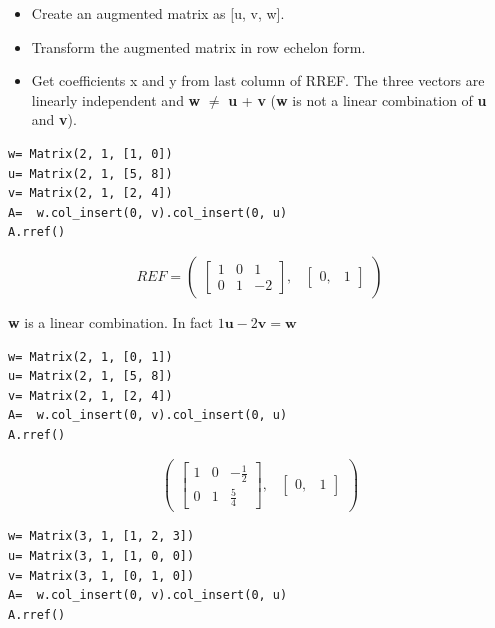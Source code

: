 \begin{itemize}
\item Create an augmented matrix as [u, v, w].
\item Transform the augmented matrix in row echelon form.
\item Get coefficients x and y from last column of RREF. The three vectors are linearly
independent and \textbf{w} $\neq$ \textbf{u} + \textbf{v} (\textbf{w} is not a linear
combination of \textbf{u} and \textbf{v}).

\end{itemize}

\begin{verbatim}
w= Matrix(2, 1, [1, 0])
u= Matrix(2, 1, [5, 8])
v= Matrix(2, 1, [2, 4])
A=  w.col_insert(0, v).col_insert(0, u)
A.rref()
\end{verbatim}

\begin{equation}
REF= \begin{pmatrix}\left[\begin{matrix}1 & 0 & 1\\0 & 1 & -2\end{matrix}\right], & \begin{bmatrix}0, & 1\end{bmatrix}\end{pmatrix}
\end{equation}

\textbf{w} is a linear combination. In fact $1\mathbf{u} -2\mathbf{v}= \mathbf{w}$

\begin{verbatim}
w= Matrix(2, 1, [0, 1])
u= Matrix(2, 1, [5, 8])
v= Matrix(2, 1, [2, 4])
A=  w.col_insert(0, v).col_insert(0, u)
A.rref()
\end{verbatim}

\begin{equation}\label{eq:}
\begin{pmatrix}\left[\begin{matrix}1 & 0 & - \frac{1}{2}\\0 & 1 & \frac{5}{4}\end{matrix}\right], & \begin{bmatrix}0, & 1\end{bmatrix}\end{pmatrix}
\end{equation}

\begin{verbatim}
w= Matrix(3, 1, [1, 2, 3])
u= Matrix(3, 1, [1, 0, 0])
v= Matrix(3, 1, [0, 1, 0])
A=  w.col_insert(0, v).col_insert(0, u)
A.rref()
\end{verbatim}

